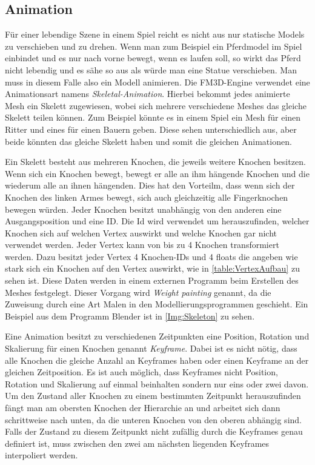 \subsection{Animation}

Für einer lebendige Szene in einem Spiel reicht es nicht aus nur statische Models zu verschieben und zu drehen. Wenn man zum Beispiel ein Pferdmodel im Spiel einbindet und es nur nach vorne bewegt, wenn es laufen soll, so wirkt das Pferd nicht lebendig und es sähe so aus als würde man eine Statue verschieben. Man muss in diesem Falle also ein Modell animieren.
Die FM3D-Engine verwendet eine Animationsart namens \textit{Skeletal-Animation}. Hierbei bekommt jedes animierte Mesh ein Skelett zugewiesen, wobei sich mehrere verschiedene Meshes das gleiche Skelett teilen können. Zum Beispiel könnte es in einem Spiel ein Mesh für einen Ritter und eines für einen Bauern geben. Diese sehen unterschiedlich aus, aber beide könnten das gleiche Skelett haben und somit die gleichen Animationen.

Ein Skelett besteht aus mehreren Knochen, die jeweils weitere Knochen besitzen. Wenn sich ein Knochen bewegt, bewegt er alle an ihm hängende Knochen und die wiederum alle an ihnen hängenden. 
Dies hat den Vorteilm, dass wenn sich der Knochen des linken Armes bewegt, sich auch gleichzeitig alle Fingerknochen bewegen würden. Jeder Knochen besitzt unabhängig von den anderen eine Ausgangsposition und eine ID.
Die Id wird verwendet um herauszufinden, welcher Knochen sich auf welchen Vertex auswirkt und welche Knochen gar nicht verwendet werden. Jeder Vertex kann von bis zu 4 Knochen transformiert werden. Dazu besitzt jeder Vertex 4 Knochen-IDs und 4 floats die angeben wie stark sich ein Knochen auf den Vertex auswirkt, wie in \cref{table:VertexAufbau} zu sehen ist. Diese Daten werden in einem externen Programm beim Erstellen des Meshes festgelegt. Dieser Vorgang wird \textit{Weight painting} genannt, da die Zuweisung durch eine Art Malen in den Modellierungsprogrammen geschieht. Ein Beispiel aus dem Programm Blender ist in \cref{Img:Skeleton} zu sehen.

Eine Animation besitzt zu verschiedenen Zeitpunkten eine Position, Rotation und Skalierung für einen Knochen genannt \textit{Keyframe}. Dabei ist es nicht nötig, dass alle Knochen die gleiche Anzahl an Keyframes haben oder einen Keyframe an der gleichen Zeitposition. Es ist auch möglich, dass Keyframes nicht Position, Rotation und Skalierung auf einmal beinhalten sondern nur eins oder zwei davon. Um den Zustand aller Knochen zu einem bestimmten Zeitpunkt herauszufinden fängt man am obersten Knochen der Hierarchie an und arbeitet sich dann schrittweise nach unten, da die unteren Knochen von den oberen abhängig sind. 
Falls der Zustand zu diesem Zeitpunkt nicht zufällig durch die Keyframes genau definiert ist, muss zwischen den zwei am nächsten liegenden Keyframes interpoliert werden.


